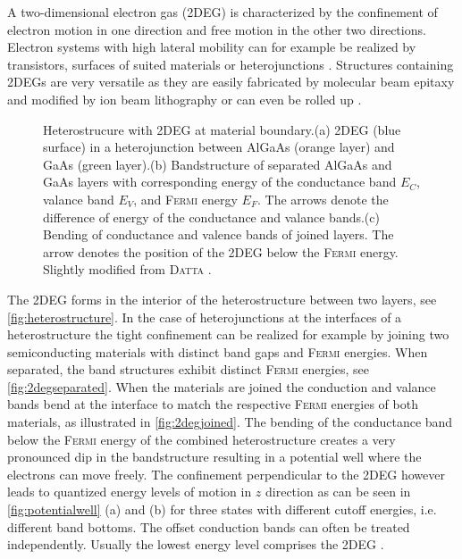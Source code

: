 A two-dimensional electron gas (2DEG) is characterized by the confinement of electron motion in one direction and free motion in the other two directions. 
Electron systems with high lateral mobility can for example be realized by transistors, surfaces of suited materials \cite{PhysRevLett.12.271} or heterojunctions \cite{JVSTB.4.853}. Structures containing 2DEGs are very versatile as they are easily fabricated by molecular beam epitaxy and modified by ion beam litho\-graphy \cite{Ingram1995}\cite{Nowack2009Thesis} or can even be rolled up \cite{Vorob'ev2004171}. 
\begin{figure}[!h]
\centering
{} \quad\quad
{} \quad\quad
{}
\caption{Heterostrucure with 2DEG at material boundary.(a) 2DEG (blue surface) in a heterojunction between AlGaAs (orange layer) and GaAs (green layer).(b) Bandstructure of separated AlGaAs and GaAs layers with corresponding energy of the conductance band $E_C$, valance band $E_V$, and \textsc{Fermi} energy $E_F$. The arrows denote the difference of energy of the conductance and valance bands.(c) Bending of conductance and valence bands of joined layers. The arrow denotes the position of the 2DEG below the \textsc{Fermi} energy. Slightly modified from \textsc{Datta} \cite{Datta1997}.}
\label{fig:hetero2deg}
\end{figure}
The 2DEG forms in the interior of the heterostructure between two layers, see \cref{fig:heterostructure}. In the case of heterojunctions at the interfaces of a heterostructure the tight confinement can be realized for example by joining two semiconducting materials with distinct band gaps and \textsc{Fermi} energies. When separated, the band structures exhibit distinct \textsc{Fermi} energies, see \cref{fig:2degseparated}. When the materials are joined the conduction and valance bands bend at the interface to match the respective \textsc{Fermi} energies of both materials, as illustrated in \cref{fig:2degjoined}.
The bending of the conductance band below the \textsc{Fermi} energy of the combined heterostructure creates a very pronounced dip in the bandstructure resulting in a potential well where the electrons can move freely. The confinement perpendicular to the 2DEG however leads to quantized energy levels of motion in $z$ direction as can be seen in \cref{fig:potentialwell} (a) and (b) for three states with different cutoff energies, i.e. different band bottoms. The offset conduction bands can often be treated independently. Usually the lowest energy level comprises the 2DEG \cite{Datta1997}.
